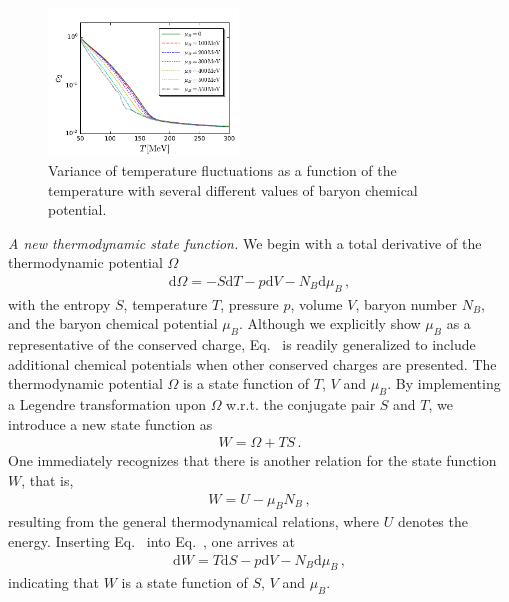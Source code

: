 \documentclass[aps,twocolumn,
prl,
superscriptaddress,nofootinbib,floatfix]{revtex4-2}
\begin{document}

%
\begin{figure}[t]
\includegraphics[width=0.45\textwidth]{c2}
\caption{Variance of temperature fluctuations as a function of the temperature with several different values of baryon chemical potential.}
\label{fig:c2}
\end{figure}
%

\textit{A new thermodynamic state function.} \label{sec:Wfunction}  We begin with a total derivative of the thermodynamic potential $\Omega$
\begin{align}
    \mathrm{d} \Omega=-S \mathrm{d} T-p \mathrm{d}V-N_B \mathrm{d} \mu_B\,, \label{eq:dOmega}
\end{align}
with the entropy $S$, temperature $T$, pressure $p$, volume $V$, baryon number $N_B$, and the baryon chemical potential $\mu_B$. Although we explicitly show $\mu_B$ as a representative of the conserved charge, Eq.~ is readily generalized to include additional chemical potentials when other conserved charges are presented. The thermodynamic potential $\Omega$ is a state function of $T$, $V$ and $\mu_B$. By implementing a Legendre transformation upon $\Omega$ w.r.t. the conjugate pair $S$ and $T$, we introduce a new state function as
\begin{align}
    W=\Omega+TS\,. \label{eq:W-def}
\end{align}
One immediately recognizes that there is another relation for the state function $W$, that is,
\begin{align}
    W=U-\mu_B N_B\,,\label{}
\end{align}
resulting from the general thermodynamical relations, where $U$ denotes the energy. Inserting Eq.~ into Eq.~, one arrives at
\begin{align}
    \mathrm{d} W=T\mathrm{d} S-p \mathrm{d}V-N_B \mathrm{d} \mu_B\,, \label{eq:dW}
\end{align}
indicating that $W$ is a state function of $S$, $V$ and $\mu_B$.
\end{document}
